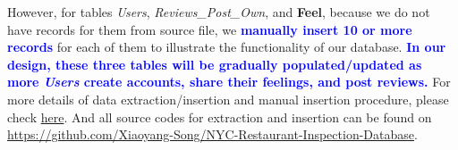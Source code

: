 \documentclass[a4paper,12pt]{article}
\theoremstyle{definition}
\begin{document}
However, for tables \textit{Users}, \textit{Reviews\_Post\_Own}, and \textbf{Feel}, because we do not have records for them from source file, we  \textcolor{Blue}{\textbf{manually insert 10 or more records}} for each of them to illustrate the functionality of our database. \textcolor{Blue}{\textbf{In our design, these three tables will be gradually populated/updated as more \textit{Users} create accounts, share their feelings, and post reviews.}} For more details of data extraction/insertion and manual insertion procedure, please check \href{https://github.com/Xiaoyang-Song/NYC-Restaurant-Inspection-Database/blob/main/4111p1.ipynb}{here}. And all source codes for extraction and insertion can be found on \href{https://github.com/Xiaoyang-Song/NYC-Restaurant-Inspection-Database}{https://github.com/Xiaoyang-Song/NYC-Restaurant-Inspection-Database}.
\newpage
\end{document}
